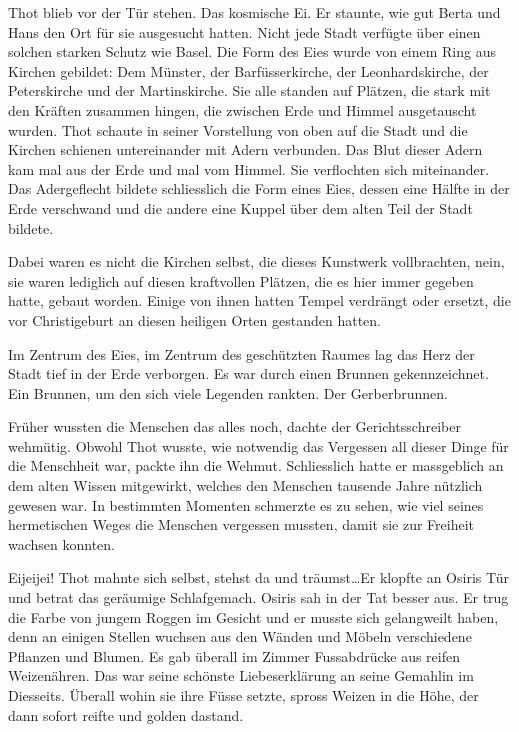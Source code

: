 \documentclass[11pt,titlepage,a5paper]{book}
\begin{document}
Thot blieb vor der Tür stehen. Das kosmische Ei. Er staunte, wie gut Berta und Hans den Ort für sie ausgesucht hatten. Nicht jede Stadt verfügte über einen solchen starken Schutz wie Basel. Die Form des Eies wurde von einem Ring aus Kirchen gebildet: Dem Münster, der Barfüsserkirche, der Leonhardskirche, der Peterskirche und der Martinskirche. Sie alle standen auf Plätzen, die stark mit den Kräften zusammen hingen, die zwischen Erde und Himmel ausgetauscht wurden. Thot schaute in seiner Vorstellung von oben auf die Stadt und die Kirchen schienen untereinander mit Adern verbunden. Das Blut dieser Adern kam mal aus der Erde und mal vom Himmel. Sie verflochten sich miteinander. Das Adergeflecht bildete schliesslich die Form eines Eies, dessen eine Hälfte in der Erde verschwand und die andere eine Kuppel über dem alten Teil der Stadt bildete.

Dabei waren es nicht die Kirchen selbst, die dieses Kunstwerk vollbrachten, nein, sie waren lediglich auf diesen  kraftvollen Plätzen, die es hier immer gegeben hatte, gebaut worden. Einige von ihnen hatten Tempel verdrängt oder ersetzt, die vor Christigeburt  an diesen heiligen Orten gestanden hatten.

Im Zentrum des Eies, im Zentrum des geschützten Raumes lag das Herz der Stadt tief in der Erde verborgen. Es war durch einen Brunnen gekennzeichnet. Ein Brunnen, um den sich viele Legenden rankten. Der Gerberbrunnen.

Früher wussten die Menschen das alles noch, dachte der Gerichtsschreiber wehmütig. Obwohl Thot wusste, wie notwendig das Vergessen all dieser Dinge für die Menschheit war, packte ihn die Wehmut. Schliesslich hatte er massgeblich an dem alten Wissen mitgewirkt, welches den Menschen tausende Jahre nützlich gewesen war. In bestimmten Momenten schmerzte es zu sehen, wie viel seines hermetischen Weges die Menschen vergessen mussten, damit sie zur Freiheit wachsen konnten.

Eijeijei! Thot mahnte sich selbst, stehst da und träumst\dots Er klopfte an Osiris Tür und betrat das geräumige Schlafgemach. Osiris sah in der Tat besser aus. Er trug die Farbe von jungem Roggen im Gesicht und er musste sich gelangweilt haben, denn an einigen Stellen wuchsen aus den Wänden und Möbeln verschiedene Pflanzen und Blumen. Es gab überall im Zimmer Fussabdrücke aus reifen Weizenähren. Das war seine schönste Liebeserklärung an seine Gemahlin im Diesseits. Überall wohin sie ihre Füsse setzte, spross Weizen in die Höhe, der dann sofort reifte und golden dastand.
\end{document}
